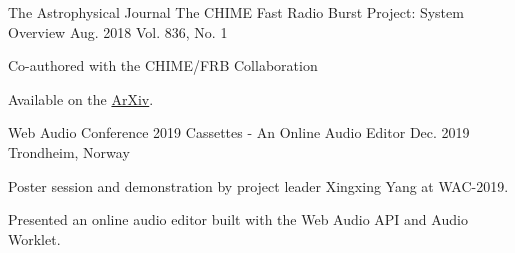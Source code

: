 \begin{cventries}
  \cventry
    {The Astrophysical Journal} %
    {The CHIME Fast Radio Burst Project: System Overview} %
    {Aug. 2018} %
    {Vol. 836, No. 1} %
    {
      \begin{cvitems} %
        \item {Co-authored with the CHIME/FRB Collaboration}
        \item {Available on the \href{https://arxiv.org/abs/1803.11235}{ArXiv}.}
      \end{cvitems}
    }

  \cventry
    {Web Audio Conference 2019} %
    {Cassettes - An Online Audio Editor} %
    {Dec. 2019} %
    {Trondheim, Norway} %
    {
      \begin{cvitems} %
        \item {Poster session and demonstration by project leader Xingxing Yang
               at WAC-2019.}
        \item {Presented an online audio editor built with the Web Audio API and Audio Worklet.}
      \end{cvitems}
    }

\end{cventries}
